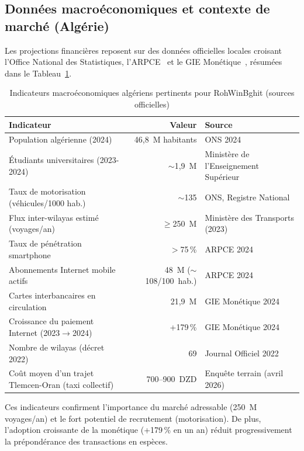 \subsection{Données macroéconomiques et contexte de marché (Algérie)}

Les projections financières reposent sur des données officielles locales croisant l'Office National des Statistiques, l'ARPCE~\cite{arpt_2024} et le GIE Monétique~\cite{gie_monetique_2024}, résumées dans le Tableau~\ref{tab:macro-algerie}.

\begin{table}[H]
\centering
\footnotesize
\begin{tabularx}{\textwidth}{|X|r|l|}
\hline
\rowcolor{rohlight}
\textbf{Indicateur} & \textbf{Valeur} & \textbf{Source} \\
\hline
Population algérienne (2024) & 46,8~M habitants & ONS 2024 \\
\hline
Étudiants universitaires (2023-2024) & $\sim$1,9~M & Ministère de l'Enseignement Supérieur \\
\hline
Taux de motorisation (véhicules/1000 hab.) & $\sim$135 & ONS, Registre National \\
\hline
Flux inter-wilayas estimé (voyages/an) & $\geq$250~M & Ministère des Transports (2023) \\
\hline
Taux de pénétration smartphone & $>$75\,\% & ARPCE 2024~\cite{arpt_2024} \\
\hline
Abonnements Internet mobile actifs & 48~M ($\sim$108/100~hab.) & ARPCE 2024~\cite{arpt_2024} \\
\hline
Cartes interbancaires en circulation & 21,9~M & GIE Monétique 2024~\cite{gie_monetique_2024} \\
\hline
Croissance du paiement Internet (2023$\rightarrow$2024) & +179\,\% & GIE Monétique 2024~\cite{gie_monetique_2024} \\
\hline
Nombre de wilayas (décret 2022) & 69 & Journal Officiel 2022 \\
\hline
Coût moyen d'un trajet Tlemcen-Oran (taxi collectif) & 700--900~DZD & Enquête terrain (avril 2026) \\
\hline
\end{tabularx}
  \caption{Indicateurs macroéconomiques algériens pertinents pour RohWinBghit (sources officielles)}
  \label{tab:macro-algerie}
\end{table}

Ces indicateurs confirment l'importance du marché adressable (250~M voyages/an) et le fort potentiel de recrutement (motorisation). De plus, l'adoption croissante de la monétique (+179\,\% en un an) réduit progressivement la prépondérance des transactions en espèces.

